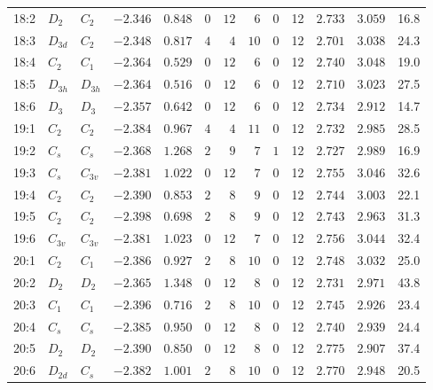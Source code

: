 \begin{table}[ht!]
{\begin{tabular}{lllrrrrrrrrrr}
18:2    & $D_2$    & $C_{2 }$  & $-2.346$ & $0.848$  & $0$ & $12$ & $6$  & $0$ & 12 & $2.733$ & $3.059$  &  16.8 \\
18:3    & $D_{3d}$ & $C_{2 }$  & $-2.348$ & $0.817$  & $4$ & $4$  & $10$ & $0$ & 12 & $2.701$ & $3.038$  &  24.3 \\
18:4    & $C_2$    & $C_{1 }$  & $-2.364$ & $0.529$  & $0$ & $12$ & $6$  & $0$ & 12 & $2.740$ & $3.048$  &  19.0 \\
18:5    & $D_{3h}$ & $D_{3h}$  & $-2.364$ & $0.516$  & $0$ & $12$ & $6$  & $0$ & 12 & $2.710$ & $3.023$  &  27.5 \\
18:6    & $D_3$    & $D_{3 }$  & $-2.357$ & $0.642$  & $0$ & $12$ & $6$  & $0$ & 12 & $2.734$ & $2.912$  &  14.7 \\
19:1    & $C_2$    & $C_{2 }$  & $-2.384$ & $0.967$  & $4$ & $4$  & $11$ & $0$ & 12 & $2.732$ & $2.985$  &  28.5 \\
19:2    & $C_s$    & $C_{s }$  & $-2.368$ & $1.268$  & $2$ & $9$  & $7$  & $1$ & 12 & $2.727$ & $2.989$  &  16.9 \\
19:3    & $C_s$    & $C_{3v}$  & $-2.381$ & $1.022$  & $0$ & $12$ & $7$  & $0$ & 12 & $2.755$ & $3.046$  &  32.6 \\
19:4    & $C_2$    & $C_{2 }$  & $-2.390$ & $0.853$  & $2$ & $8$  & $9$  & $0$ & 12 & $2.744$ & $3.003$  &  22.1 \\
19:5    & $C_2$    & $C_{2 }$  & $-2.398$ & $0.698$  & $2$ & $8$  & $9$  & $0$ & 12 & $2.743$ & $2.963$  &  31.3 \\
19:6    & $C_{3v}$ & $C_{3v}$  & $-2.381$ & $1.023$  & $0$ & $12$ & $7$  & $0$ & 12 & $2.756$ & $3.044$  &  32.4 \\
20:1    & $C_2$    & $C_{1 }$  & $-2.386$ & $0.927$  & $2$ & $8$  & $10$ & $0$ & 12 & $2.748$ & $3.032$  &  25.0 \\
20:2    & $D_2$    & $D_{2 }$  & $-2.365$ & $1.348$  & $0$ & $12$ & $8$  & $0$ & 12 & $2.731$ & $2.971$  &  43.8 \\
20:3    & $C_1$    & $C_{1 }$  & $-2.396$ & $0.716$  & $2$ & $8$  & $10$ & $0$ & 12 & $2.745$ & $2.926$  &  23.4 \\
20:4    & $C_s$    & $C_{s }$  & $-2.385$ & $0.950$  & $0$ & $12$ & $8$  & $0$ & 12 & $2.740$ & $2.939$  &  24.4 \\
20:5    & $D_2$    & $D_{2 }$  & $-2.390$ & $0.850$  & $0$ & $12$ & $8$  & $0$ & 12 & $2.775$ & $2.907$  &  37.4 \\
20:6    & $D_{2d}$ & $C_{s }$  & $-2.382$ & $1.001$  & $2$ & $8$  & $10$ & $0$ & 12 & $2.770$ & $2.948$  &  20.5 \\

\end{tabular}}
\end{table}
